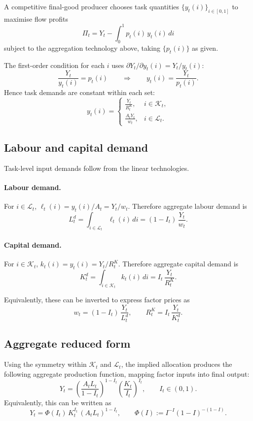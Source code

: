 \documentclass{article}
\begin{document}
A competitive final-good producer chooses task quantities $\{y_t(i)\}_{i\in[0,1]}$ to maximise flow profits
$$
\Pi_t = Y_t - \int_0^1 p_t(i)\,y_t(i)\,di
$$
subject to the aggregation technology above, taking $\{p_t(i)\}$ as given.

The first-order condition for each $i$ uses $\partial Y_t / \partial y_t(i) = Y_t / y_t(i)$:
$$
\frac{Y_t}{y_t(i)} = p_t(i)
\qquad \Longrightarrow \qquad
y_t(i) = \frac{Y_t}{p_t(i)}.
$$
Hence task demands are constant within each set:
$$
y_t(i) =
\begin{cases}
\displaystyle \frac{Y_t}{R^K_t}, & i \in \mathcal K_t,\\[10pt]
\displaystyle \frac{A_t Y_t}{w_t}, & i \in \mathcal L_t.
\end{cases}
$$

\subsection{Labour and capital demand}

Task-level input demands follow from the linear technologies.

\paragraph{Labour demand.}
For $i \in \mathcal L_t$, $\ell_t(i) = y_t(i)/A_t = Y_t/w_t$. Therefore aggregate labour demand is
$$
L_t^d = \int_{i\in\mathcal L_t} \ell_t(i)\,di
      = (1-I_t)\,\frac{Y_t}{w_t}.
$$

\paragraph{Capital demand.}
For $i \in \mathcal K_t$, $k_t(i) = y_t(i) = Y_t/R^K_t$. Therefore aggregate capital demand is
$$
K_t^d = \int_{i\in\mathcal K_t} k_t(i)\,di
      = I_t\,\frac{Y_t}{R^K_t}.
$$

Equivalently, these can be inverted to express factor prices as
$$
w_t = (1-I_t)\,\frac{Y_t}{L_t^d},
\qquad
R^K_t = I_t\,\frac{Y_t}{K_t^d}.
$$

\subsection{Aggregate reduced form}

Using the symmetry within $\mathcal K_t$ and $\mathcal L_t$, the implied allocation produces the following aggregate production function, mapping factor inputs into final output:
$$
Y_t
=
\left(\frac{A_t L_t}{1-I_t}\right)^{1-I_t}
\left(\frac{K_t}{I_t}\right)^{I_t},
\qquad I_t \in (0,1).
$$
Equivalently, this can be written as
$$
Y_t = \Phi(I_t)\,K_t^{I_t}\,(A_t L_t)^{1-I_t},
\qquad
\Phi(I) := I^{-I}(1-I)^{-(1-I)}.
$$
\end{document}
